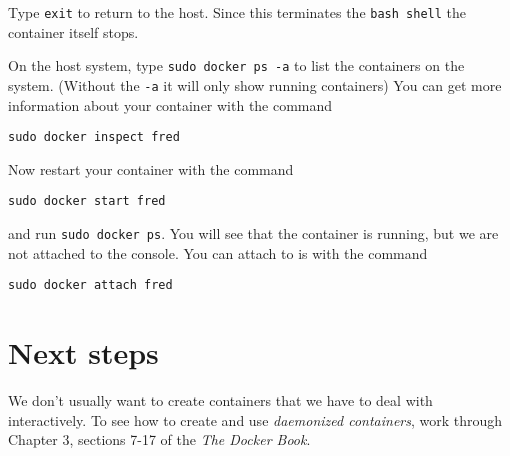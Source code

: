 \documentclass{article}
\begin{document}
Type \texttt{exit} to return to the host. Since this terminates the \texttt{bash shell} the container itself stops.

On the host system, type \texttt{sudo docker ps -a} to list the containers on the system. (Without the \texttt{-a} it will only show running containers) You can get more information about your container with the command

\texttt{sudo docker inspect fred}

Now restart your container with the command 

\texttt{sudo docker start fred}

and run \texttt{sudo docker ps}.  You will see that the container is running, but we are not attached to the console.  You can attach to is with the command

\texttt{sudo docker attach fred}

\section{Next steps}
We don't usually want to create containers that we have to deal with interactively.  To see how to create and use \emph{daemonized containers}, work through  Chapter 3, sections 7-17 of the \emph{The Docker Book}.
\end{document}
